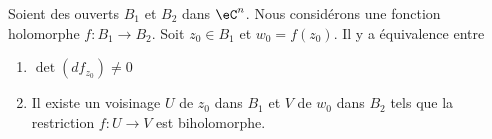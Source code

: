 \begin{theorem}       \label{THOooNBGZooHuGtxW}
	Soient des ouverts \( B_1\) et \( B_2\) dans \( \eC^n\). Nous considérons une fonction holomorphe \( f\colon B_1\to B_2\). Soit \( z_0\in B_1\) et \( w_0=f(z_0)\). Il y a équivalence entre
	\begin{enumerate}
		\item
		      \( \det(df_{z_0})\neq 0\)
		\item
		      Il existe un voisinage \( U\) de \( z_0\) dans \( B_1\) et \( V\) de \( w_0\) dans \( B_2\) tels que la restriction \( f\colon U\to V\) est biholomorphe.
	\end{enumerate}
\end{theorem}

